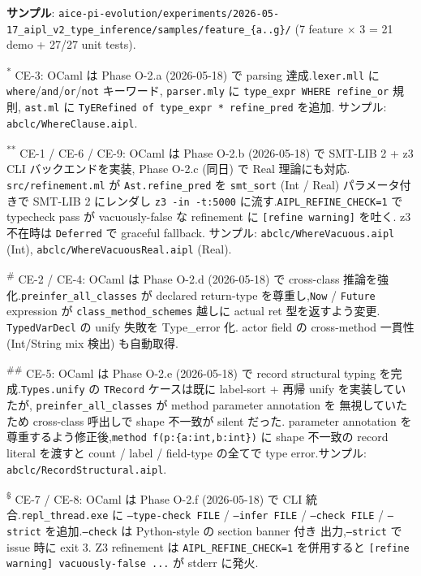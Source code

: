 \documentclass[10pt,a4paper,landscape]{article}
\begin{document}
\textbf{サンプル}: \texttt{aice-pi-evolution/experiments/2026-05-17\_aipl\_v2\_type\_inference/samples/feature\_\{a..g\}/}
(7 feature $\times$ 3 = 21 demo + 27/27 unit tests).

\smallskip
\noindent\textsuperscript{*} CE-3: OCaml は Phase O-2.a (2026-05-18) で
parsing 達成.\texttt{lexer.mll} に \texttt{where}/\texttt{and}/\texttt{or}/\texttt{not} キーワード,
\texttt{parser.mly} に \texttt{type\_expr WHERE refine\_or} 規則,
\texttt{ast.ml} に \texttt{TyERefined of type\_expr * refine\_pred} を追加.
サンプル: \texttt{abclc/WhereClause.aipl}.

\noindent\textsuperscript{**} CE-1 / CE-6 / CE-9: OCaml は Phase O-2.b
(2026-05-18) で SMT-LIB 2 + z3 CLI バックエンドを実装,
Phase O-2.c (同日) で Real 理論にも対応.
\texttt{src/refinement.ml} が \texttt{Ast.refine\_pred} を \texttt{smt\_sort}
(Int / Real) パラメータ付きで SMT-LIB 2 にレンダし \texttt{z3 -in -t:5000}
に流す.\texttt{AIPL\_REFINE\_CHECK=1} で typecheck pass が
vacuously-false な refinement に \texttt{[refine warning]} を吐く.
z3 不在時は \texttt{Deferred} で graceful fallback.
サンプル: \texttt{abclc/WhereVacuous.aipl} (Int), \texttt{abclc/WhereVacuousReal.aipl} (Real).

\smallskip
\noindent\textsuperscript{\#} CE-2 / CE-4: OCaml は Phase O-2.d (2026-05-18) で
cross-class 推論を強化.\texttt{preinfer\_all\_classes} が declared
return-type を尊重し,\texttt{Now} / \texttt{Future} expression が
\texttt{class\_method\_schemes} 越しに actual ret 型を返すよう変更.
\texttt{TypedVarDecl} の unify 失敗を Type\_error 化.
actor field の cross-method 一貫性 (Int/String mix 検出) も自動取得.

\smallskip
\noindent\textsuperscript{\#\#} CE-5: OCaml は Phase O-2.e (2026-05-18) で
record structural typing を完成.\texttt{Types.unify} の \texttt{TRecord}
ケースは既に label-sort + 再帰 unify を実装していたが,
\texttt{preinfer\_all\_classes} が method parameter annotation を
無視していたため cross-class 呼出しで shape 不一致が silent だった.
parameter annotation を尊重するよう修正後,\texttt{method f(p:\{a:int,b:int\})}
に shape 不一致の record literal を渡すと count / label / field-type
の全てで type error.サンプル: \texttt{abclc/RecordStructural.aipl}.

\smallskip
\noindent\textsuperscript{\$} CE-7 / CE-8: OCaml は Phase O-2.f
(2026-05-18) で CLI 統合.\texttt{repl\_thread.exe} に
\texttt{--type-check FILE} / \texttt{--infer FILE} / \texttt{--check FILE} / \texttt{--strict}
を追加.\texttt{--check} は Python-style の section banner 付き
出力,\texttt{--strict} で issue 時に exit 3.
Z3 refinement は \texttt{AIPL\_REFINE\_CHECK=1} を併用すると
\texttt{[refine warning] vacuously-false ...} が stderr に発火.
\end{document}
